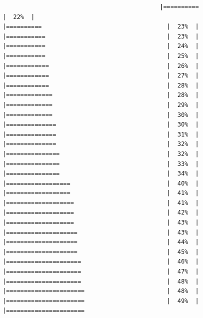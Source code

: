 \documentclass[
  krantz2]{krantz}
\begin{document}
\begin{verbatim}
                                            |==========                                   |  22%  |                                                     |==========                                   |  23%  |                                                     |===========                                  |  23%  |                                                     |===========                                  |  24%  |                                                     |===========                                  |  25%  |                                                     |============                                 |  26%  |                                                     |============                                 |  27%  |                                                     |============                                 |  28%  |                                                     |=============                                |  28%  |                                                     |=============                                |  29%  |                                                     |=============                                |  30%  |                                                     |==============                               |  30%  |                                                     |==============                               |  31%  |                                                     |==============                               |  32%  |                                                     |===============                              |  32%  |                                                     |===============                              |  33%  |                                                     |===============                              |  34%  |                                                     |==================                           |  40%  |                                                     |==================                           |  41%  |                                                     |===================                          |  41%  |                                                     |===================                          |  42%  |                                                     |===================                          |  43%  |                                                     |====================                         |  43%  |                                                     |====================                         |  44%  |                                                     |====================                         |  45%  |                                                     |=====================                        |  46%  |                                                     |=====================                        |  47%  |                                                     |=====================                        |  48%  |                                                     |======================                       |  48%  |                                                     |======================                       |  49%  |                                                     |======================            
\end{verbatim}
\end{document}
